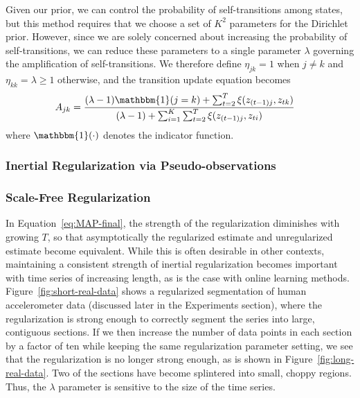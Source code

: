 \documentclass[letterpaper]{article}
\begin{document}
Given our prior, we can control the probability of self-transitions among states, but this method requires that we choose a set of $K^2$ parameters for the Dirichlet prior. However, since we are solely concerned about increasing the probability of self-transitions, we can reduce these parameters to a single parameter $\lambda$ governing the amplification of self-transitions. We therefore define $\eta_{jk} = 1$ when $j\not=k$ and $\eta_{kk}= \lambda \geq 1$ otherwise, and the transition update equation becomes
\begin{align}\label{eq:MAP-final}
    A_{jk} &= \frac{(\lambda - 1){\mathbbm{1}(j = k)} + \sum_{t=2}^{T} \xi(z_{(t-1)j}, z_{tk})}   
    {(\lambda - 1) + \sum_{i=1}^{K}\sum_{t=2}^{T} \xi(z_{(t-1)j}, z_{ti})}
\end{align}
where $\mathbbm{1}(\cdot)$ denotes the indicator function.

\subsubsection{Inertial Regularization via Pseudo-observations}



\subsubsection{Scale-Free Regularization}

In Equation~\ref{eq:MAP-final}, the strength of the regularization diminishes with growing $T$, so that asymptotically the regularized estimate and unregularized estimate become equivalent. While this is often desirable in other contexts, maintaining a consistent strength of inertial regularization becomes important with time series of increasing length, as is the case with online learning methods. Figure~\ref{fig:short-real-data} shows a regularized segmentation of human accelerometer data (discussed later in the Experiments section), where the regularization is strong enough to correctly segment the series into large, contiguous sections. If we then increase the number of data points in each section by a factor of ten while keeping the same regularization parameter setting, we see that the regularization is no longer strong enough, as is shown in Figure~\ref{fig:long-real-data}. Two of the sections have become splintered into small, choppy regions. Thus, the $\lambda$ parameter is sensitive to the size of the time series.
\end{document}
